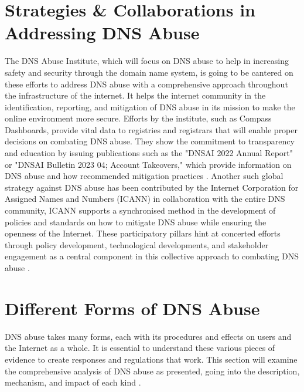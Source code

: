 \section{Strategies \& Collaborations in Addressing DNS Abuse}

The DNS Abuse Institute, which will focus on DNS abuse to help in increasing safety and security through the domain name system, is going to be cantered on these efforts to address DNS abuse with a comprehensive approach throughout the infrastructure of the internet. It helps the internet community in the identification, reporting, and mitigation of DNS abuse in its mission to make the online environment more secure. Efforts by the institute, such as Compass Dashboards, provide vital data to registries and registrars that will enable proper decisions on combating DNS abuse. They show the commitment to transparency and education by issuing publications such as the "DNSAI 2022 Annual Report" or "DNSAI Bulletin 2023 04; Account Takeovers," which provide information on DNS abuse and how recommended mitigation practices \cite{dnsabuseinstitute2023}. Another such global strategy against DNS abuse has been contributed by the Internet Corporation for Assigned Names and Numbers (ICANN)\cite{icann2022dnsabuse} in collaboration with the entire DNS community, ICANN supports a synchronised method in the development of policies and standards on how to mitigate DNS abuse while ensuring the openness of the Internet. These participatory pillars hint at concerted efforts through policy development, technological developments, and stakeholder engagement as a central component in this collective approach to combating DNS abuse \cite{dnsai2022report}. 



\section{Different Forms of DNS Abuse}

DNS abuse takes many forms, each with its procedures and effects on users and the Internet as a whole. It is essential to understand these various pieces of evidence to create responses and regulations that work. This section will examine the comprehensive analysis of DNS abuse as presented, going into the description, mechanism, and impact of each kind \cite{dotmagazine2022dnsabuse}.

